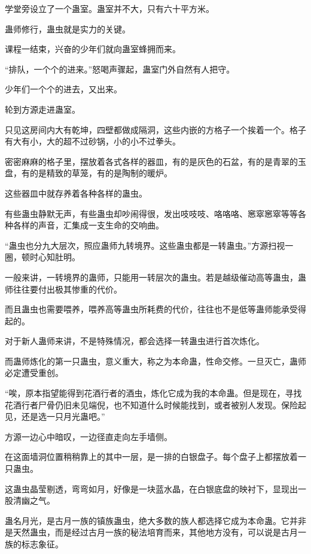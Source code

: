 
\begin{this_body}



学堂旁设立了一个蛊室。蛊室并不大，只有六十平方米。

蛊师修行，蛊虫就是实力的关键。

课程一结束，兴奋的少年们就向蛊室蜂拥而来。

“排队，一个个的进来。”怒喝声骤起，蛊室门外自然有人把守。

少年们一个个的进去，又出来。

轮到方源走进蛊室。

只见这房间内大有乾坤，四壁都做成隔洞，这些内嵌的方格子一个挨着一个。格子有大有小，大的超不过砂锅，小的小不过拳头。

密密麻麻的格子里，摆放着各式各样的器皿，有的是灰色的石盆，有的是青翠的玉盘，有的是精致的草笼，有的是陶制的暖炉。

这些器皿中就存养着各种各样的蛊虫。

有些蛊虫静默无声，有些蛊虫却吵闹得很，发出吱吱吱、咯咯咯、窸窣窸窣等等各种各样的声音，汇集成一支生命的交响曲。

“蛊虫也分九大层次，照应蛊师九转境界。这些蛊虫都是一转蛊虫。”方源扫视一圈，顿时心知肚明。

一般来讲，一转境界的蛊师，只能用一转层次的蛊虫。若是越级催动高等蛊虫，蛊师往往要付出极其惨重的代价。

而且蛊虫也需要喂养，喂养高等蛊虫所耗费的代价，往往也不是低等蛊师能承受得起的。

对于新人蛊师来讲，不是特殊情况，都会选择一转蛊虫进行首次炼化。

而蛊师炼化的第一只蛊虫，意义重大，称之为本命蛊，性命交修。一旦灭亡，蛊师必定遭受重创。

“唉，原本指望能得到花酒行者的酒虫，炼化它成为我的本命蛊。但是现在，寻找花酒行者尸骨仍旧未见端倪，也不知道什么时候能找到，或者被别人发现。保险起见，还是选一只月光蛊吧。”

方源一边心中暗叹，一边径直走向左手墙侧。

在这面墙洞位置稍稍靠上的其中一层，是一排的白银盘子。每个盘子上都摆放着一只蛊虫。

这蛊虫晶莹剔透，弯弯如月，好像是一块蓝水晶，在白银底盘的映衬下，显现出一股清幽之气。

蛊名月光，是古月一族的镇族蛊虫，绝大多数的族人都选择它成为本命蛊。它并非是天然蛊虫，而是经过古月一族的秘法培育而来，其他地方没有，可以说是古月一族的标志象征。


\end{this_body}
